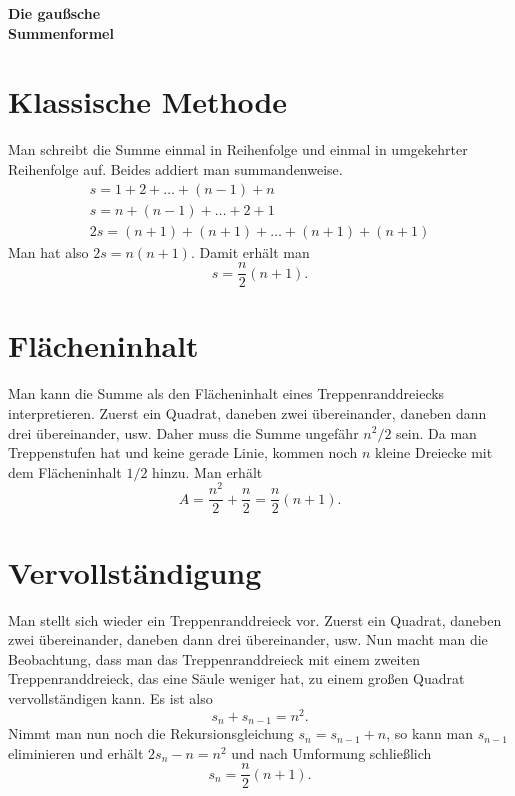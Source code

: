 \documentclass[a4paper,10pt,fleqn,twocolumn,twoside]{article}
\begin{document}
\thispagestyle{empty}

\begin{huge}
\noindent
\textbf{Die gaußsche\\
Summenformel}
\par
\end{huge}


\section{Klassische Methode}

Man schreibt die Summe einmal in Reihenfolge und einmal in
umgekehrter Reihenfolge auf. Beides addiert man summandenweise.
\begin{gather*}
s = 1+2+\ldots+(n-1)+n\\
s = n+(n-1)+\ldots+2+1\\
2s = (n+1)+(n+1)+\ldots+(n+1)+(n+1)
\end{gather*}
Man hat also \(2s=n(n+1)\). Damit erhält man
\[s = \frac{n}{2}(n+1).\]


\section{Flächeninhalt}

Man kann die Summe als den Flächeninhalt eines Treppenranddreiecks
interpretieren. Zuerst ein Quadrat, daneben zwei übereinander,
daneben dann drei übereinander, usw.
Daher muss die Summe ungefähr \(n^2/2\) sein. Da man Treppenstufen
hat und keine gerade Linie, kommen noch \(n\) kleine Dreiecke mit
dem Flächeninhalt \(1/2\) hinzu. Man erhält
\[A = \frac{n^2}{2}+\frac{n}{2} = \frac{n}{2}(n+1).\]


\section{Vervollständigung}

Man stellt sich wieder ein Treppenranddreieck vor.
Zuerst ein Quadrat, daneben zwei übereinander, daneben dann drei übereinander, usw.
Nun macht man die Beobachtung, dass man das Treppenranddreieck mit
einem zweiten Treppenranddreieck, das eine Säule weniger hat,
zu einem großen Quadrat vervollständigen kann. Es ist also
\[s_n+s_{n-1} = n^2.\]
Nimmt man nun noch die Rekursionsgleichung \(s_{n}=s_{n-1}+n\),
so kann man \(s_{n-1}\) eliminieren und erhält \(2s_n-n = n^2\)
und nach Umformung schließlich
\[s_n = \frac{n}{2}(n+1).\]
\end{document}

